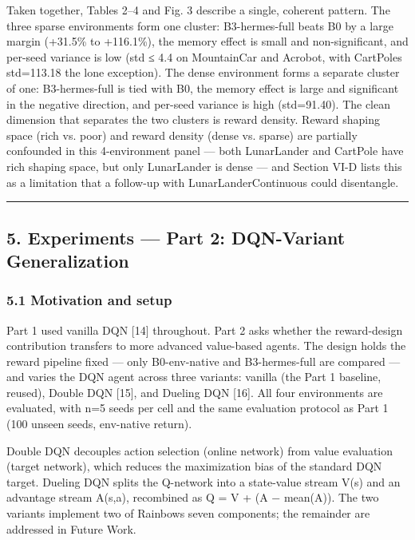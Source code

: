 Taken together, Tables 2--4 and Fig. 3 describe a single, coherent pattern. The three sparse environments form one cluster: B3-hermes-full beats B0 by a large margin (+31.5\% to +116.1\%), the memory effect is small and non-significant, and per-seed variance is low (std ≤ 4.4 on MountainCar and Acrobot, with CartPole\textquotesingle s std=113.18 the lone exception). The dense environment forms a separate cluster of one: B3-hermes-full is tied with B0, the memory effect is large and significant in the negative direction, and per-seed variance is high (std=91.40). The clean dimension that separates the two clusters is reward density. Reward shaping space (rich vs. poor) and reward density (dense vs. sparse) are partially confounded in this 4-environment panel --- both LunarLander and CartPole have rich shaping space, but only LunarLander is dense --- and Section VI-D lists this as a limitation that a follow-up with LunarLanderContinuous could disentangle.

\begin{center}\rule{0.5\linewidth}{0.5pt}\end{center}

\subsection{5. Experiments --- Part 2: DQN-Variant Generalization}\label{5-experiments--part-2-dqn-variant-generalization}

\subsubsection{5.1 Motivation and setup}\label{51-motivation-and-setup}

Part 1 used vanilla DQN {[}14{]} throughout. Part 2 asks whether the reward-design contribution transfers to more advanced value-based agents. The design holds the reward pipeline fixed --- only B0-env-native and B3-hermes-full are compared --- and varies the DQN agent across three variants: vanilla (the Part 1 baseline, reused), Double DQN {[}15{]}, and Dueling DQN {[}16{]}. All four environments are evaluated, with n=5 seeds per cell and the same evaluation protocol as Part 1 (100 unseen seeds, env-native return).

Double DQN decouples action selection (online network) from value evaluation (target network), which reduces the maximization bias of the standard DQN target. Dueling DQN splits the Q-network into a state-value stream V(s) and an advantage stream A(s,a), recombined as Q = V + (A − mean(A)). The two variants implement two of Rainbow\textquotesingle s seven components; the remainder are addressed in Future Work.

